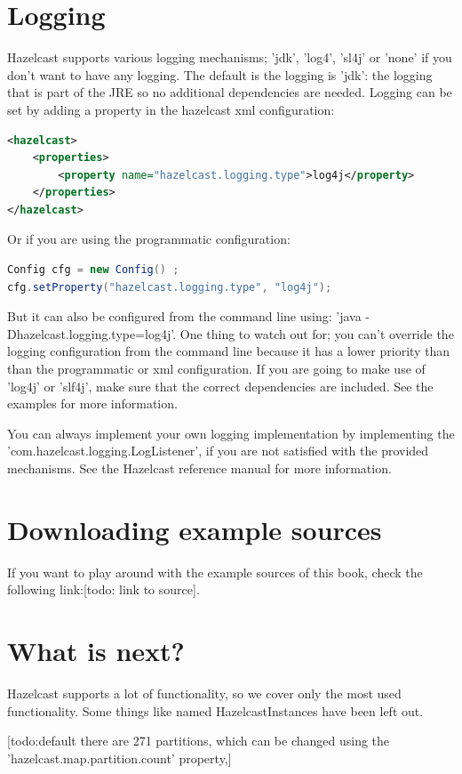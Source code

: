 \section{Logging}
Hazelcast supports various logging mechanisms; 'jdk', 'log4', 'sl4j' or 'none' if you don't want to have any logging. The default is the logging is 'jdk': the logging that is part of the JRE so no additional dependencies are needed. Logging can be set by adding a property in the hazelcast xml configuration:
\begin{lstlisting}[language=xml]
<hazelcast>
    <properties>
        <property name="hazelcast.logging.type">log4j</property>
    </properties>
</hazelcast>
\end{lstlisting}
Or if you are using the programmatic configuration:
\begin{lstlisting}[language=java]
Config cfg = new Config() ;
cfg.setProperty("hazelcast.logging.type", "log4j");
\end{lstlisting}
But it can also be configured from the command line using: 'java -Dhazelcast.logging.type=log4j'. One thing to watch out for; you can't override the logging configuration from the command line because it has a lower priority than than the programmatic or xml configuration. If you are going to make use of 'log4j' or 'slf4j', make sure that the correct dependencies are included. See the examples for more information.

You can always implement your own logging implementation by implementing the 'com.hazelcast.logging.LogListener', if you are not satisfied with the provided mechanisms. See the Hazelcast reference manual for more information.

\section{Downloading example sources}
If you want to play around with the example sources of this book, check the following link:[todo: link to source]. 

\section{What is next?}
Hazelcast supports a lot of functionality, so we cover only the most used functionality. Some things like named HazelcastInstances have been left out.


[todo:default there are 271 partitions, which can be changed using the 'hazelcast.map.partition.count' property,]